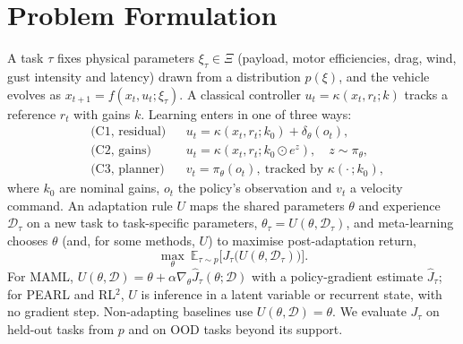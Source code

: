 \section{Problem Formulation}\label{sec:problem}

A task $\tau$ fixes physical parameters $\xi_\tau \in \Xi$ (payload, motor efficiencies, drag, wind, gust intensity and latency) drawn from a distribution $p(\xi)$, and the vehicle evolves as $x_{t+1} = f(x_t, u_t; \xi_\tau)$. A classical controller $u_t = \kappa(x_t, r_t; k)$ tracks a reference $r_t$ with gains $k$. Learning enters in one of three ways:
\begin{align}
&\text{(C1, residual)} && u_t = \kappa(x_t, r_t; k_0) + \delta_\theta(o_t), \\
&\text{(C2, gains)} && u_t = \kappa(x_t, r_t; k_0 \odot e^{z}), \quad z \sim \pi_\theta, \\
&\text{(C3, planner)} && v_t = \pi_\theta(o_t), \ \text{tracked by } \kappa(\cdot\,; k_0),
\end{align}
where $k_0$ are nominal gains, $o_t$ the policy's observation and $v_t$ a velocity command. An adaptation rule $U$ maps the shared parameters $\theta$ and experience $\mathcal{D}_\tau$ on a new task to task-specific parameters, $\theta_\tau = U(\theta, \mathcal{D}_\tau)$, and meta-learning chooses $\theta$ (and, for some methods, $U$) to maximise post-adaptation return,
\begin{equation}
\max_{\theta}\ \mathbb{E}_{\tau \sim p}\big[ J_\tau\big(U(\theta, \mathcal{D}_\tau)\big) \big].
\end{equation}
For MAML, $U(\theta, \mathcal{D}) = \theta + \alpha \nabla_\theta \hat{J}_\tau(\theta; \mathcal{D})$ with a policy-gradient estimate $\hat{J}_\tau$; for PEARL and RL$^2$, $U$ is inference in a latent variable or recurrent state, with no gradient step. Non-adapting baselines use $U(\theta, \mathcal{D}) = \theta$. We evaluate $J_\tau$ on held-out tasks from $p$ and on OOD tasks beyond its support.

